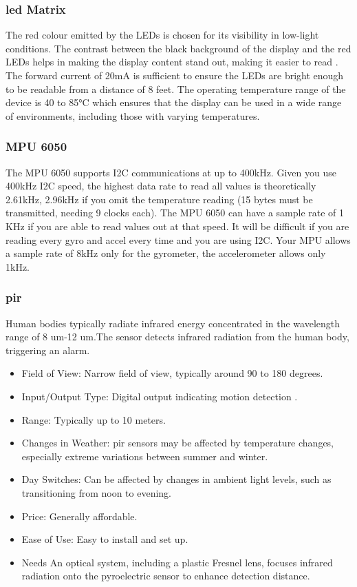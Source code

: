 \documentclass[12pt]{article} %
\begin{document}
\subsubsection{\acrshort{led} Matrix}
The red colour emitted by the LEDs\cite{noauthor_-depth_2020} is chosen for its visibility in low-light conditions. The contrast between the black background of the display and the red LEDs helps in making the display content stand out, making it easier to read . The forward current of 20mA is sufficient to ensure the LEDs are bright enough to be readable from a distance of 8 feet. The operating temperature range of the device is 40 to 85°C which ensures that the display can be used in a wide range of environments, including those with varying temperatures.

\subsubsection{\gls{MPU 6050}}
The \gls{MPU 6050}\cite{noauthor_arduino_2021} supports I2C communications\cite{noauthor_basics_nodate} at up to 400kHz. Given you use 400kHz I2C speed, the highest data rate to read all values is theoretically 2.61kHz, 2.96kHz if you omit the temperature reading (15 bytes must be transmitted, needing 9 clocks each). The \gls{MPU 6050} can have a sample rate of 1 KHz if you are able to read values out at that speed. It will be difficult if you are reading every gyro and accel every time and you are using I2C. Your MPU allows a sample rate of 8kHz only for the \gls{gyrometer}, the accelerometer allows only 1kHz.

\subsubsection{\acrlong{pir} }
Human bodies typically radiate infrared energy concentrated in the wavelength range of 8 um-12 um.The sensor detects infrared radiation from the human body, triggering an alarm.
\begin{itemize}
    \item Field of View: Narrow field of view, typically around 90 to 180 degrees.
    \item Input/Output Type: Digital output indicating motion detection .
    \item Range: Typically up to 10 meters.
    \item Changes in Weather: \acrshort{pir}\cite{noauthor_passive_nodate} sensors may be affected by temperature changes, especially extreme variations between summer and winter.
    \item Day Switches: Can be affected by changes in ambient light levels, such as transitioning from noon to evening.
    \item Price: Generally affordable.
    \item Ease of Use: Easy to install and set up.
    \item Needs An optical system, including a plastic Fresnel lens, focuses infrared radiation onto the pyroelectric sensor to enhance detection distance.
\end{itemize}
\end{document}
